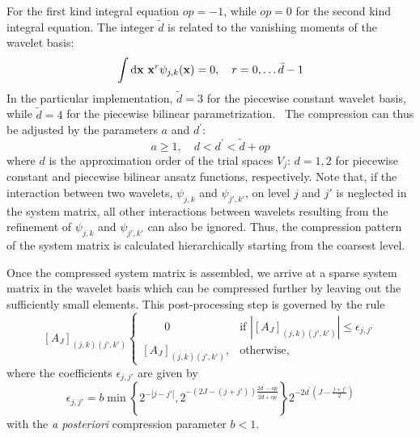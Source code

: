 For the first kind integral equation $op = -1$, while $op = 0$ for the second
kind integral equation. The integer $\tilde{d}$ is related to the vanishing
moments of the wavelet basis:
\begin{equation}
  \int \mathop{}\!\mathrm{d}\mathbf{x}\,\,\mathbf{x}^r \psi_{j,k}(\mathbf{x}) = 0,
\quad r = 0, \ldots \tilde{d}-1
\end{equation}
In the particular implementation, $\tilde{d}=3$ for the piecewise
constant wavelet basis,  while $\tilde{d}=4$ for the piecewise bilinear
parametrization.~\autocite{Harbrecht2013-hb}
The compression can thus be adjusted by the parameters $a$ and
$d^\prime$:
\begin{equation}\label{eq:param}
  a \geq 1, \quad d < d^\prime < \tilde{d} + op
\end{equation}
where $d$ is the approximation order of the trial spaces $V_j$:
$d=1, 2$ for piecewise constant and
piecewise bilinear ansatz functions, respectively.
Note that, if the interaction between two wavelets, $\psi_{j,k}$ and $\psi_{j',k'}$, on
level $j$ and $j'$ is neglected in the system matrix, all other
interactions between wavelets resulting from the refinement of
$\psi_{j,k}$ and $\psi_{j',k'}$ can also be ignored. Thus, the
compression pattern of the system matrix is calculated
hierarchically starting from the coarsest level.

Once the compressed system matrix is assembled, we arrive at a sparse
system matrix in the wavelet basis which can be compressed further by
leaving out the sufficiently small elements. This post-processing step
is governed by the rule
\begin{equation}
  \left[A_J\right]_{\left(j,k\right)\left(j',k'\right)}
  \begin{cases}
    \quad\quad 0 & \text{if } |\left[ A_J \right]_{\left(j,k\right)\left(j',k'\right)}| \leq \epsilon_{j,j'}\\
    \left[A_J\right]_{\left(j,k\right)\left(j',k'\right)}, & \text{otherwise,}
  \end{cases}
  \label{eq:aposteriori}
\end{equation}
where the coefficients $\epsilon_{j,j'}$ are given by
\begin{equation}
  \epsilon_{j,j'} = b\min \left\{2^{-|j-j'|}, 2^{-\left(2J-\left(j+j'\right)\right)\frac{2d^\prime-op}{2\tilde{d}+op}}\right\} 2^{-2d^\prime\left(J-\frac{j+j'}{2}\right)}
\end{equation}
with the \emph{a posteriori} compression parameter $b < 1$.

